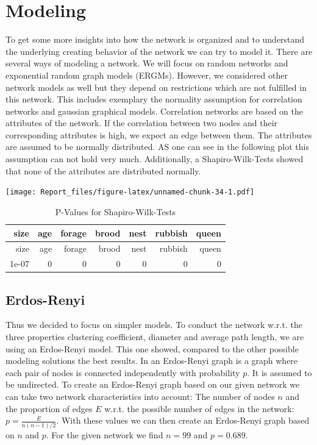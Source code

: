 \documentclass[
]{article}
\begin{document}
\hypertarget{modeling}{%
\section{Modeling}\label{modeling}}

To get some more insights into how the network is organized and to
understand the underlying creating behavior of the network we can try to
model it. There are several ways of modeling a network. We will focus on
random networks and exponential random graph models (ERGMs). However, we
considered other network models as well but they depend on restrictions
which are not fulfilled in this network. This includes exemplary the
normality assumption for correlation networks and gaussian graphical
models. Correlation networks are based on the attributes of the network.
If the correlation between two nodes and their corresponding attributes
is high, we expect an edge between them. The attributes are assumed to
be normally distributed. AS one can see in the following plot this
assumption can not hold very much. Additionally, a Shapiro-Wilk-Tests
showed that none of the attributes are distributed normally.

\texttt{[image: Report\_files/figure-latex/unnamed-chunk-34-1.pdf]}

\begin{longtable}[]{@{}rrrrrrr@{}}
\caption{P-Values for Shapiro-Wilk-Tests}\tabularnewline
\toprule
size & age & forage & brood & nest & rubbish & queen\tabularnewline
\midrule
\endfirsthead
\toprule
size & age & forage & brood & nest & rubbish & queen\tabularnewline
\midrule
\endhead
1e-07 & 0 & 0 & 0 & 0 & 0 & 0\tabularnewline
\bottomrule
\end{longtable}

\hypertarget{erdos-renyi}{%
\subsection{Erdos-Renyi}\label{erdos-renyi}}

Thus we decided to focus on simpler models. To conduct the network
w.r.t. the three properties clustering coefficient, diameter and average
path length, we are using an Erdos-Renyi model. This one showed,
compared to the other possible modeling solutions the best results. In
an Erdos-Renyi graph is a graph where each pair of nodes is connected
independently with probability \(p\). It is assumed to be undirected. To
create an Erdos-Renyi graph based on our given network we can take two
network characteristics into account: The number of nodes \(n\) and the
proportion of edges \(E\) w.r.t. the possible number of edges in the
network: \(p=\frac{E}{n(n-1)/2}\). With these values we can then create
an Erdos-Renyi graph based on \(n\) and \(p\). For the given network we
find \(n=99\) and \(p=0.689\).
\end{document}
